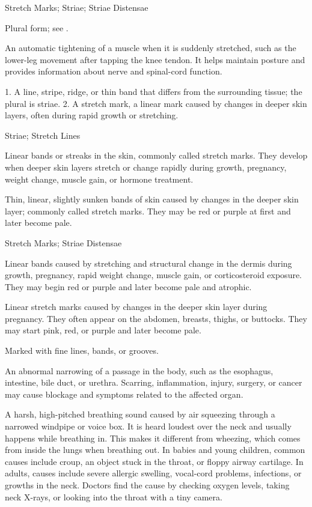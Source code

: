 \synonyms
Stretch Marks; Striae; Striae Distensae

 Plural form; see .

 An automatic tightening of a muscle when it is suddenly stretched, such as the lower-leg movement after tapping the knee tendon. It helps maintain posture and provides information about nerve and spinal-cord function.

 1. A line, stripe, ridge, or thin band that differs from the surrounding tissue; the plural is striae. 2. A stretch mark, a linear mark caused by changes in deeper skin layers, often during rapid growth or stretching.

\synonyms
Striae; Stretch Lines

 Linear bands or streaks in the skin, commonly called stretch marks. They develop when deeper skin layers stretch or change rapidly during growth, pregnancy, weight change, muscle gain, or hormone treatment.

 Thin, linear, slightly sunken bands of skin caused by changes in the deeper skin layer; commonly called stretch marks. They may be red or purple at first and later become pale.

\synonyms
Stretch Marks; Striae Distensae

 Linear bands caused by stretching and structural change in the dermis during growth, pregnancy, rapid weight change, muscle gain, or corticosteroid exposure. They may begin red or purple and later become pale and atrophic.

 Linear stretch marks caused by changes in the deeper skin layer during pregnancy. They often appear on the abdomen, breasts, thighs, or buttocks. They may start pink, red, or purple and later become pale.

 Marked with fine lines, bands, or grooves.

 An abnormal narrowing of a passage in the body, such as the esophagus, intestine, bile duct, or urethra. Scarring, inflammation, injury, surgery, or cancer may cause blockage and symptoms related to the affected organ.

 A harsh, high-pitched breathing sound caused by air squeezing through a narrowed windpipe or voice box. It is heard loudest over the neck and usually happens while breathing in. This makes it different from wheezing, which comes from inside the lungs when breathing out. In babies and young children, common causes include croup, an object stuck in the throat, or floppy airway cartilage. In adults, causes include severe allergic swelling, vocal-cord problems, infections, or growths in the neck. Doctors find the cause by checking oxygen levels, taking neck X-rays, or looking into the throat with a tiny camera.


